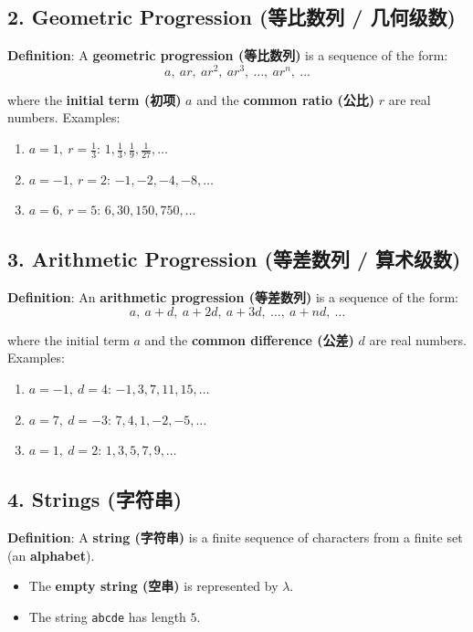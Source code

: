 \documentclass[10pt,a4paper,openany]{ctexbook}
\theoremstyle{definition}
\theoremstyle{remark}
\begin{document}
\vspace{-2pt}

\subsection{2. Geometric Progression (等比数列 / 几何级数)}

\textbf{Definition}: A \textbf{geometric progression (等比数列)} is a sequence of the form:
\[
a,\ ar,\ ar^2,\ ar^3,\ \dots,\ ar^n,\ \dots
\]

where the \textbf{initial term (初项)} $a$ and the \textbf{common ratio (公比)} $r$ are real numbers.
Examples:
\begin{enumerate}
\item $a = 1,\ r = \frac{1}{3}$: $1, \frac{1}{3}, \frac{1}{9}, \frac{1}{27}, \dots$
\item $a = -1,\ r = 2$: $-1, -2, -4, -8, \dots$
\item $a = 6,\ r = 5$: $6, 30, 150, 750, \dots$

\end{enumerate}

\vspace{-2pt}

\subsection{3. Arithmetic Progression (等差数列 / 算术级数)}

\textbf{Definition}: An \textbf{arithmetic progression (等差数列)} is a sequence of the form:
\[
a,\ a+d,\ a+2d,\ a+3d,\ \dots,\ a+nd,\ \dots
\]

where the initial term $a$ and the \textbf{common difference (公差)} $d$ are real numbers.
Examples:
\begin{enumerate}
\item $a = -1,\ d = 4$: $-1, 3, 7, 11, 15, \dots$
\item $a = 7,\ d = -3$: $7, 4, 1, -2, -5, \dots$
\item $a = 1,\ d = 2$: $1, 3, 5, 7, 9, \dots$

\end{enumerate}

\vspace{-2pt}

\subsection{4. Strings (字符串)}

\textbf{Definition}: A \textbf{string (字符串)} is a finite sequence of characters from a finite set (an \textbf{alphabet}).
\begin{itemize}
\item The \textbf{empty string (空串)} is represented by $\lambda$.
\item The string \texttt{abcde} has length $5$.

\end{itemize}
\end{document}
